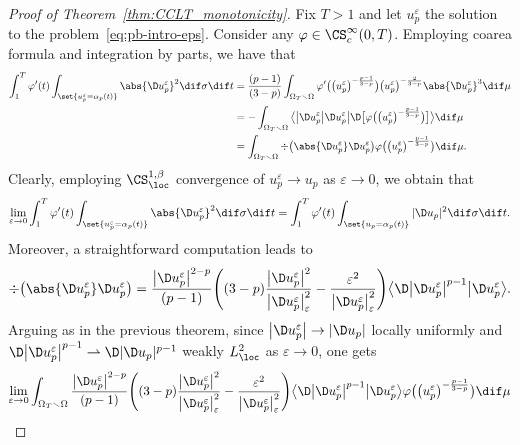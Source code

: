 \begin{proof}[Proof of Theorem~\ref{thm:CCLT_monotonicity}] Fix $T>1$ and let $u^\varepsilon_p$ the solution to the problem~\eqref{eq:pb-intro-eps}. Consider any $\varphi \in \CS^\infty_c(0,T)$. Employing coarea formula and integration by parts, we have that
\begin{align}
 \int_1^{T} \varphi'(t) \int_{\set{u^\varepsilon_p=\alpha_p(t)}} \abs{ \D u^\varepsilon_p}^2 \dif \sigma \dif t &{}= \frac{(p-1)}{(3-p)} \int_{\Omega_T \smallsetminus \Omega} \varphi' \big(\big(u_p^\varepsilon\big)^{-\frac{p-1}{3-p}} \big)\big(u_p^\varepsilon\big)^{-\frac{2}{3-p}} \abs{ \D u^\varepsilon_p}^3 \dif \mu \nonumber\\
 &{}=- \int_{\Omega_T \smallsetminus \Omega} \big\langle\big| \D u^\varepsilon_p\big|\D u^\varepsilon_p\big| \D \big[\varphi \big(\big(u_p^\varepsilon\big)^{-\frac{p-1}{3-p}}\big)\big]\big\rangle \dif \mu \nonumber\\
 &{}= \int_{\Omega_T \smallsetminus \Omega} \div \big( \abs{ \D u^\varepsilon_p} \D u^\varepsilon_p\big) \varphi \big(\big(u_p^\varepsilon\big)^{-\frac{p-1}{3-p}}\big) \dif \mu. \label{eq:main_chan}
\end{align}
Clearly, employing $\CS^{1, \beta}_{\loc}$ convergence of $u^\varepsilon_p \to u_p$ as $\varepsilon \to 0$, we obtain that
\[
 \lim_{\varepsilon\to 0}\int_1^{T} \varphi'(t) \int_{\set{u^\varepsilon_p=\alpha_p(t)}} \abs{ \D u^\varepsilon_p}^2 \dif \sigma \dif t = \int_1^{T} \varphi'(t) \int_{\set{u_p=\alpha_p(t)}} | \D u_p |^2 \dif \sigma \dif t.
\]
Moreover, a straightforward computation leads to
\[
 \div \big( \abs{ \D u^\varepsilon_p} \D u^\varepsilon_p\big) =\frac{\big| \D u^\varepsilon_p\big|^{2-p}}{(p-1)} \Bigg( (3-p) \frac{ \big| \D u^\varepsilon_p\big|^2}{\big| \D u^\varepsilon_p \big|^2_\varepsilon}- \frac{ \varepsilon^2}{\big| \D u^\varepsilon_p\big|_{\varepsilon}^2} \Bigg) \big\langle\D \big| \D u^\varepsilon_p \big|^{p-1} \big| \D u^\varepsilon_p\big\rangle.
\]
Arguing as in the previous theorem, since $\big|\D u^\varepsilon_p\big| \to |\D u_p |$ locally uniformly and $\D\big|\D u^\varepsilon_p\big|^{p-1} \rightharpoonup\D |\D u_p |^{p-1}$ weakly $L^2_{\loc}$ as $\varepsilon\to 0$, one gets
\begin{gather*}
 \lim_{\varepsilon \to 0} \int_{\Omega_T \smallsetminus \Omega} \frac{\big| \D u^\varepsilon_p\big|^{2-p}}{(p-1)} \Bigg( (3-p) \frac{ \big| \D u^\varepsilon_p\big|^2}{\big| \D u^\varepsilon_p \big|^2_\varepsilon}- \frac{ \varepsilon^2}{\big| \D u^\varepsilon_p\big|_{\varepsilon}^2} \Bigg) \big\langle\D \big| \D u^\varepsilon_p \big|^{p-1} \big| \D u^\varepsilon_p\big\rangle \varphi \big(\big(u_p^\varepsilon\big)^{-\frac{p-1}{3-p}}\big) \dif \mu\\

\end{gather*}
\end{proof}
